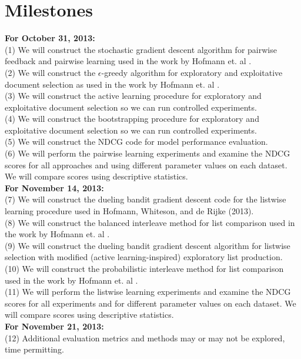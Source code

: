 \documentclass{acm_proc_article-sp}
\begin{document}
\section{Milestones}
{\bf For October 31, 2013:}\\
(1) We will construct the stochastic gradient descent algorithm for pairwise feedback and pairwise learning used in the work by Hofmann et. al \cite{hofmann}.\\
(2) We will construct the $\epsilon$-greedy algorithm for exploratory and exploitative document selection as used in the work by Hofmann et. al \cite{hofmann}.\\
(3) We will construct the active learning procedure for exploratory and exploitative document selection so we can run controlled experiments.\\
(4) We will construct the bootstrapping procedure for exploratory and exploitative document selection so we can run controlled experiments.\\
(5) We will construct the NDCG code for model performance evaluation.\\
(6) We will perform the pairwise learning experiments and examine the NDCG scores for all approaches and using different parameter values on each dataset. We will compare scores using descriptive statistics. \\
{\bf For November 14, 2013:} \\
(7) We will construct the dueling bandit gradient descent code for the listwise learning procedure used in Hofmann, Whiteson, and de Rijke (2013).\\
(8) We will construct the balanced interleave method for list comparison used in the work by Hofmann et. al \cite{hofmann}.\\
(9) We will construct the dueling bandit gradient descent algorithm for listwise selection with modified (active learning-inspired) exploratory list production.\\
(10) We will construct the probabilistic interleave method for list comparison used in the work by Hofmann et. al \cite{hofmann}.\\
(11) We will perform the listwise learning experiments and examine the NDCG scores for all experiments and for different parameter values on each dataset. We will compare scores using descriptive statistics.  \\
{\bf For November 21, 2013:}\\
(12) Additional evaluation metrics and methods may or may not be explored, time permitting. \\
\end{document}
